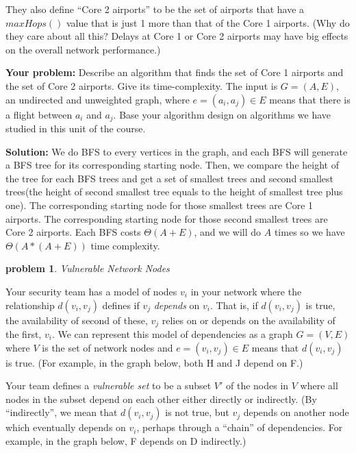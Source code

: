\documentclass[10pt]{article}
\newcommand{\solution}[1]{\color{blue}\hfill\break\noindent\textbf{Solution:} #1\color{black}}
\newtheorem{problem}{\sc\color{cit}problem}
\begin{document}
They also define ``Core 2 airports'' to be the set of airports that have a $maxHops()$ value that is just 1 more than that of the Core 1 airports.  (Why do they care about all this?  Delays at Core 1 or Core 2 airports may have big effects on the overall network performance.)

\textbf{Your problem: } Describe an algorithm that finds the set of Core 1 airports and the set of Core 2 airports.  Give its time-complexity.   The input is $G=(A,E)$, an undirected and unweighted graph, where $e = (a_i, a_j) \in E$ means that there is a flight between $a_i$ and $a_j$. Base your algorithm design on algorithms we have studied in this unit of the course.

\solution{
We do BFS to every vertices in the graph, and each BFS will generate a BFS tree for its corresponding starting node. Then, we compare the height of the tree for each BFS trees and get a set of smallest trees and second smallest trees(the height of second smallest tree equals to the height of smallest tree plus one). The corresponding starting node for those smallest trees are Core 1 airports. The corresponding starting node for those second smallest trees are Core 2 airports. Each BFS costs $\Theta (A+E)$, and we will do $A$ times so we have $\Theta(A*(A+E))$ time complexity. 
}



\begin{problem}Vulnerable Network Nodes\end{problem}

Your security team has a model of nodes $v_i$ in your network where the relationship $d(v_i, v_j)$ defines if $v_j$ \emph{depends} on $v_i$. That is, if $d(v_i, v_j)$ is true,  the availability of second of these, $v_j$ relies on or depends on the availability of the first, $v_i$. We can represent this model of dependencies as a graph $G=(V,E)$ where $V$ is the set of network nodes and $e=(v_i, v_j) \in E$ means that $d(v_i, v_j)$ is true.  (For example, in the graph below, both H and J depend on F.)

Your team defines a \emph{vulnerable set} to be a subset $V'$ of the nodes in $V$ where all nodes in the subset depend on each other either directly or indirectly. (By ``indirectly'', we mean that $d(v_i, v_j)$ is not true, but $v_j$ depends on another node which eventually depends on $v_i$, perhaps through a ``chain'' of dependencies. For example, in the graph below, F depends on D indirectly.) 
\end{document}
